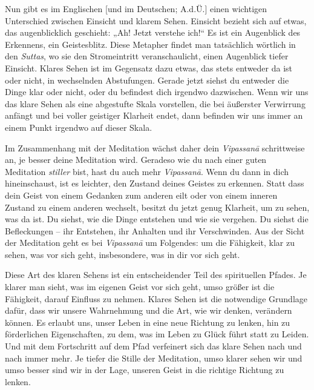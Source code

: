 \documentclass[12pt,openany]{book}
\begin{document}
Nun gibt es im Englischen [und im Deutschen; A.d.Ü.] einen wichtigen Unterschied zwischen Einsicht und klarem Sehen. Einsicht bezieht sich auf etwas, das augenblicklich geschieht: „Ah! Jetzt verstehe ich!“ Es ist ein Augenblick des Erkennens, ein Geistesblitz. Diese Metapher findet man tatsächlich wörtlich in den \textit{Suttas}, wo sie den Stromeintritt veranschaulicht, einen Augenblick tiefer Einsicht. Klares Sehen ist im Gegensatz dazu etwas, das stets entweder da ist oder nicht, in wechselnden Abstufungen. Gerade jetzt siehst du entweder die Dinge klar oder nicht, oder du befindest dich irgendwo dazwischen. Wenn wir uns das klare Sehen als eine abgestufte Skala vorstellen, die bei äußerster Verwirrung anfängt und bei voller geistiger Klarheit endet, dann befinden wir uns immer an einem Punkt irgendwo auf dieser Skala.

Im Zusammenhang mit der Meditation wächst daher dein \textit{Vipas\-sanā} schrittweise an, je besser deine Meditation wird. Geradeso wie du nach einer guten Meditation \textit{stiller} bist, hast du auch mehr \textit{Vipas\-sanā}. Wenn du dann in dich hineinschaust, ist es leichter, den Zustand deines Geistes zu erkennen. Statt dass dein Geist von einem Gedanken zum anderen eilt oder von einem inneren Zustand zu einem anderen wechselt, besitzt du jetzt genug Klarheit, um zu sehen, was da ist. Du siehst, wie die Dinge entstehen und wie sie vergehen. Du siehst die Befleckungen – ihr Entstehen, ihr Anhalten und ihr Verschwinden. Aus der Sicht der Meditation geht es bei \textit{Vipas\-sanā} um Folgendes: um die Fähigkeit, klar zu sehen, was vor sich geht, insbesondere, was in dir vor sich geht.

Diese Art des klaren Sehens ist ein entscheidender Teil des spirituellen Pfades. Je klarer man sieht, was im eigenen Geist vor sich geht, umso größer ist die Fähigkeit, darauf Einfluss zu nehmen. Klares Sehen ist die notwendige Grundlage dafür, dass wir unsere Wahrnehmung und die Art, wie wir denken, verändern können. Es erlaubt uns, unser Leben in eine neue Richtung zu lenken, hin zu förderlichen Eigenschaften, zu dem, was im Leben zu Glück führt statt zu Leiden. Und mit dem Fortschritt auf dem Pfad verfeinert sich das klare Sehen nach und nach immer mehr. Je tiefer die Stille der Meditation, umso klarer sehen wir und umso besser sind wir in der Lage, unseren Geist in die richtige Richtung zu lenken.
\end{document}
